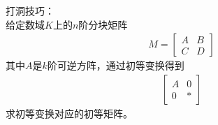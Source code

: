 \documentclass{article}
\begin{document}
\begin{zremark}
  打洞技巧：\\
  给定数域$K$上的$n$阶分块矩阵
  \begin{align*}
    M = \begin{bmatrix}
          A & B \\
          C & D
        \end{bmatrix}
  \end{align*}
  其中$A$是$k$阶可逆方阵，通过初等变换得到
  \begin{align*}
    \begin{bmatrix}
      A & 0 \\
      0 & *
    \end{bmatrix}
  \end{align*}
  求初等变换对应的初等矩阵。
\end{zremark}
\end{document}
